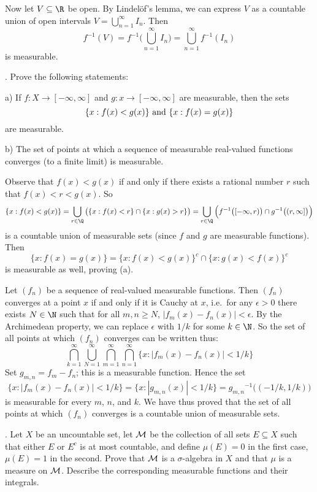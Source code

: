 Now let $V\subseteq \R$ be open. By Lindel\"of's lemma, we can express $V$ as a countable union of open intervals $V=\bigcup_{n=1}^\infty I_n$. Then
$$f^{-1}(V) = f^{-1}\bigg(\bigcup_{n=1}^\infty I_n\bigg) = \bigcup_{n=1}^\infty f^{-1}(I_n)$$
is measurable.\slug

. Prove the following statements:
\medskip
\item{a)} If $f:X\rightarrow[-\infty,\infty]$ and $g:x\rightarrow[-\infty,\infty]$ are measurable, then the sets
$$\{x : f(x) < g(x)\}\ \hbox{and}\ \{x : f(x) = g(x)\}$$
are measurable.
\item{b)} The set of points at which a sequence of measurable real-valued functions converges (to a finite limit) is measurable.

\proof Observe that $f(x) < g(x)$ if and only if there exists a rational number $r$ such that $f(x) < r < g(x)$. So
$$\{x : f(x) < g(x)\} = \bigcup_{r\in \Q} \big(\{x : f(x) < r\} \cap \{x : g(x) > r\}\big) = \bigcup_{r\in \Q} \Big(f^{-1}\big([-\infty,r)\big) \cap g^{-1}\big((r,\infty]\big)\Big)$$
is a countable union of measurable sets (since $f$ and $g$ are measurable functions). Then
$$\{x : f(x) = g(x)\} = \{x : f(x) < g(x)\}^c \cap \{x : g(x) < f(x)\}^c$$
is measurable as well, proving (a).

Let $(f_n)$ be a sequence of real-valued measurable functions. Then $(f_n)$ converges at a point $x$ if and only if it is Cauchy at $x$, i.e.\ for any $\epsilon > 0$ there exists $N\in \N$ such that for all $m,n\geq N$, $|f_m(x) - f_n(x)| < \epsilon$. By the Archimedean property, we can replace $\epsilon$ with $1/k$ for some $k\in \N$. So the set of all points at which $(f_n)$ converges can be written thus:
$$\bigcap_{k=1}^\infty \bigcup_{N=1}^\infty \bigcap_{m=1}^\infty \bigcap_{n=1}^\infty \big\{x : |f_m(x) - f_n(x)| < 1/k\big\}$$
Set $g_{m,n} = f_m - f_n$; this is a measurable function. Hence the set
$$\big\{x : |f_m(x) - f_n(x)| < 1/k\big\} = \big\{x : |g_{m,n}(x)| < 1/k\big\} = {g_{m,n}}^{-1}\big((-1/k, 1/k)\big)$$
is measurable for every $m$, $n$, and $k$. We have thus proved that the set of all points at which $(f_n)$ converges is a countable union of measurable sets.\slug

. Let $X$ be an uncountable set, let ${\cal M}$ be the collection of all sets $E\subseteq X$ such that either $E$ or $E^c$ is at most countable, and define $\mu(E) = 0$ in the first case, $\mu(E) = 1$ in the second. Prove that ${\cal M}$ is a $\sigma$-algebra in $X$ and that $\mu$ is a measure on ${\cal M}$. Describe the corresponding measurable functions and their integrals.

